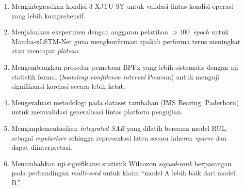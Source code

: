 \begin{enumerate}
  \item Mengintegrasikan kondisi 3 XJTU-SY untuk validasi lintas kondisi
        operasi yang lebih komprehensif.
  \item Menjalankan eksperimen dengan anggaran pelatihan $>100$~\emph{epoch}
        untuk Mamba-xLSTM-Net guna mengkonfirmasi apakah performa terus
        meningkat atau mencapai \emph{plateau}.
  \item Mengembangkan prosedur pemetaan BPFx yang lebih sistematis dengan
        uji statistik formal (\emph{bootstrap confidence interval} Pearson)
        untuk menguji signifikansi korelasi secara lebih ketat.
  \item Mengevaluasi metodologi pada dataset tambahan (IMS Bearing, Paderborn)
        untuk memvalidasi generalisasi lintas platform pengujian.
  \item Mengimplementasikan \emph{integrated SAE} yang dilatih bersama model
        RUL sebagai \emph{regularizer} sehingga representasi laten secara
        inheren \emph{sparse} dan dapat diinterpretasi.
  \item Menambahkan uji signifikansi statistik Wilcoxon \emph{signed-rank}
        berpasangan pada perbandingan \emph{multi-seed} untuk klaim
        ``model A lebih baik dari model B.''
\end{enumerate}
